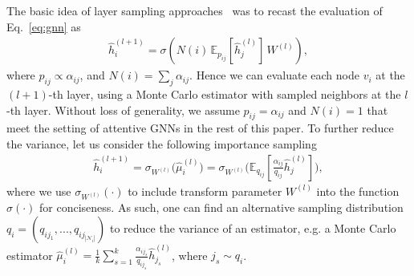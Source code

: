 \documentclass{article}
\begin{document}
The basic idea of layer sampling 
approaches~\cite{hamilton2017inductive,chen2018fastgcn,huang2018adaptive,zou2019layer}
was to recast the evaluation of Eq.~\eqref{eq:gnn} as
\begin{align}\label{eq:gnn_expectation}
\hat{h}_i^{(l+1)} = \sigma\left(N(i)\,\mathbb{E}_{p_{ij}} \left[\hat{h}_j^{(l)}\right]\,W^{(l)}\right), 
\end{align}
where $p_{ij} \propto \alpha_{ij}$, and 
$N(i) = \sum_j \alpha_{ij}$. Hence
we can evaluate each node $v_i$ at the $(l+1)$-th layer,
using a Monte Carlo
estimator with sampled neighbors at the $l$-th layer.
Without loss of generality, we assume $p_{ij} = \alpha_{ij}$
and $N(i)=1$
that meet the setting of attentive GNNs
in the rest of this paper.
To further reduce the variance, let us
consider the following importance sampling
\begin{align}
\hat{h}_i^{(l+1)} = \sigma_{W^{(l)}}\big(\hat{\mu}_i^{(l)}\big) 
= \sigma_{W^{(l)}}
\Big(\mathbb{E}_{q_{ij}}\left[\frac{\alpha_{ij}}{q_{ij}}\hat{h}_j^{(l)}\right]\Big),
\end{align}
where we use $\sigma_{W^{(l)}}(\cdot)$ to include transform parameter $W^{(l)}$ into
the function $\sigma(\cdot)$ for conciseness.
As such, one can find an alternative sampling distribution 
$q_i = (q_{ij_1}, ..., q_{ij_{|\mathcal{N}_i|}})$ 
to reduce the variance of an estimator,
e.g. a Monte Carlo estimator $\hat{\mu}_i^{(l)} = 
\frac{1}{k}\sum_{s=1}^{k}\frac{\alpha_{ij_s}}{q_{ij_s}}\hat{h}_{j_s}^{(l)}$,
where $j_s \sim q_{i}$. 
\end{document}
